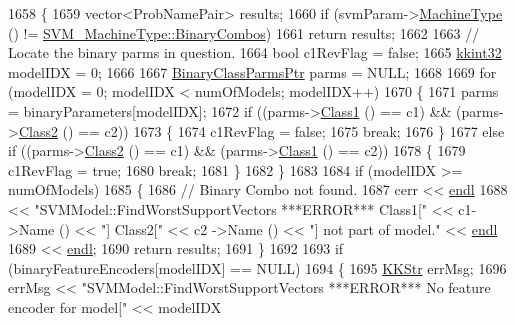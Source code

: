 \begin{DoxyCode}
1658 \{
1659   vector<ProbNamePair>  results;
1660   \textcolor{keywordflow}{if}  (svmParam->\hyperlink{class_k_k_m_l_l_1_1_s_v_mparam_a30153e00007f9cf65343e0ad97ad61fb}{MachineType} () != \hyperlink{namespace_k_k_m_l_l_ad917464bc631109a3021cf02cd27af9aa01ad67463554c5f5552dcc6b5f4a553f}{SVM\_MachineType::BinaryCombos})
1661     \textcolor{keywordflow}{return}  results;
1662 
1663   \textcolor{comment}{// Locate the binary parms in question.}
1664   \textcolor{keywordtype}{bool}  c1RevFlag = \textcolor{keyword}{false};
1665   \hyperlink{namespace_k_k_b_a8fa4952cc84fda1de4bec1fbdd8d5b1b}{kkint32}  modelIDX = 0;
1666 
1667   \hyperlink{class_k_k_m_l_l_1_1_binary_class_parms}{BinaryClassParmsPtr}  parms = NULL;
1668 
1669   \textcolor{keywordflow}{for}  (modelIDX = 0;  modelIDX < numOfModels;  modelIDX++)
1670   \{
1671     parms = binaryParameters[modelIDX];
1672     \textcolor{keywordflow}{if}  ((parms->\hyperlink{class_k_k_m_l_l_1_1_binary_class_parms_aa8519ac2f7f7e4553143e12786209415}{Class1} () == c1)  &&  (parms->\hyperlink{class_k_k_m_l_l_1_1_binary_class_parms_a38ea0c5dd0416d6aef402befeaf7a220}{Class2} () == c2))
1673     \{
1674       c1RevFlag = \textcolor{keyword}{false};
1675       \textcolor{keywordflow}{break};
1676     \}
1677     \textcolor{keywordflow}{else} \textcolor{keywordflow}{if}  ((parms->\hyperlink{class_k_k_m_l_l_1_1_binary_class_parms_a38ea0c5dd0416d6aef402befeaf7a220}{Class2} () == c1)  &&  (parms->\hyperlink{class_k_k_m_l_l_1_1_binary_class_parms_aa8519ac2f7f7e4553143e12786209415}{Class1} () == c2))
1678     \{
1679       c1RevFlag = \textcolor{keyword}{true};
1680       \textcolor{keywordflow}{break};
1681     \}
1682   \}
1683 
1684   \textcolor{keywordflow}{if}  (modelIDX >= numOfModels)
1685   \{
1686     \textcolor{comment}{// Binary Combo not found.}
1687     cerr << \hyperlink{namespace_k_k_b_ad1f50f65af6adc8fa9e6f62d007818a8}{endl}
1688          << \textcolor{stringliteral}{"SVMModel::FindWorstSupportVectors   ***ERROR***  Class1["} << c1->Name () << \textcolor{stringliteral}{"]  Class2["} << c2
      ->Name () << \textcolor{stringliteral}{"]  not part of model."} << \hyperlink{namespace_k_k_b_ad1f50f65af6adc8fa9e6f62d007818a8}{endl}
1689          << \hyperlink{namespace_k_k_b_ad1f50f65af6adc8fa9e6f62d007818a8}{endl};
1690     \textcolor{keywordflow}{return} results;
1691   \}
1692 
1693   \textcolor{keywordflow}{if}  (binaryFeatureEncoders[modelIDX] == NULL)
1694   \{
1695     \hyperlink{class_k_k_b_1_1_k_k_str}{KKStr}  errMsg;
1696     errMsg << \textcolor{stringliteral}{"SVMModel::FindWorstSupportVectors   ***ERROR***   No feature encoder for model["} << modelIDX

\end{DoxyCode}
